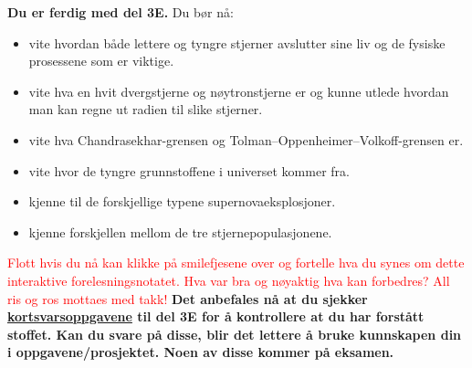 \documentclass{beamer}
\let\hrefori\href
\renewcommand{\href}[2]{{\setlength{\fboxsep}{1pt}\colorbox{sunset}{\hrefori{#1}{#2}}}}
\newcommand{\pagebutton}[1]{\setbeamertemplate{button}{\tikz\node[inner xsep = 5pt, draw = structure!90, fill = green(ryb), rounded corners = 8pt]{\color{amber}\Large\insertbuttontext};}\beamerbutton{#1}}
\begin{document}
\begin{frame}
{{\pagebutton{\small Forrige side}}\href{https://nettskjema.no/a/168692}{ \Changey[1][yellow]{-2}}
{\bf  Du er ferdig med del 3E.} Du bør nå:
\begin{itemize}
\item  vite hvordan både lettere og tyngre stjerner avslutter sine liv og de fysiske prosessene som er viktige.
\item  vite hva en hvit dvergstjerne og nøytronstjerne er og kunne utlede hvordan man kan regne ut radien til slike stjerner.
\item  vite hva Chandrasekhar-grensen og Tolman–Oppenheimer–Volkoff-grensen er.
\item  vite hvor de tyngre grunnstoffene i universet kommer fra.
\item  kjenne til de forskjellige typene supernovaeksplosjoner.
\item  kjenne forskjellen mellom de tre stjernepopulasjonene.
\end{itemize}
\textcolor{red}{Flott hvis du nå kan klikke på smilefjesene over og fortelle hva du synes om dette interaktive forelesningsnotatet. Hva var bra og nøyaktig hva kan forbedres? All ris og ros mottaes med takk!}
{\bf Det anbefales nå at du sjekker \href{https://www.uio.no/studier/emner/matnat/astro/AST2000/h21/undervisningsmateriell/kortsvarsoppgaver/del3e.pdf}{kortsvarsoppgavene} til del 3E for å kontrollere at du har forstått stoffet. Kan du svare på disse, blir det lettere å bruke kunnskapen din i oppgavene/prosjektet. Noen av disse kommer på eksamen.}
}



\end{frame}
\end{document}
